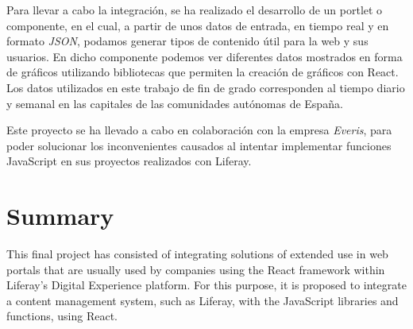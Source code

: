 \documentclass[a4paper, 12pt]{book}
\begin{document}
\vspace{5mm}
Para llevar a cabo la integración, se ha realizado el desarrollo de un portlet o componente, en el cual, a partir de unos datos de entrada, en tiempo real y en formato \textit{JSON}, podamos generar tipos de contenido útil para la web y sus usuarios. En dicho componente podemos ver diferentes datos mostrados en forma de gráficos utilizando bibliotecas que permiten la creación de gráficos con React. Los datos utilizados en este trabajo de fin de grado corresponden al tiempo diario y semanal en las capitales de las comunidades autónomas de España.

\vspace{5mm}
Este proyecto se ha llevado a cabo en colaboración con la empresa \textit{Everis}, para poder solucionar los inconvenientes causados al intentar implementar funciones JavaScript en sus proyectos realizados con Liferay.








\chapter*{Summary}
This final project has consisted of integrating solutions of extended use in web portals that are usually used by companies using the React framework within Liferay's Digital Experience platform. For this purpose, it is proposed to integrate a content management system, such as Liferay, with the JavaScript libraries and functions, using React.
\end{document}
